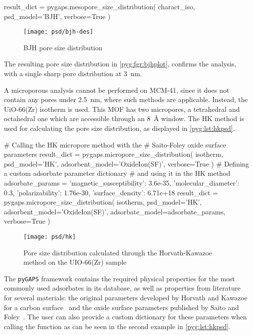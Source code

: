 \begin{python}[caption={PSD using the BJH method},%
    label={pyg:lst:bjh}]
result_dict = pygaps.mesopore_size_distribution(
    charact_iso,
    psd_model='BJH',
    verbose=True
)
\end{python}

\begin{figure}[!htb]
	\centering
	\texttt{[image: psd/bjh-des]}
	\caption{BJH pore size distribution}%
	\label{pyg:fgr:bjhplot}
\end{figure}

The resulting pore size distribution in \autoref{pyg:fgr:bjhplot},
confirms the analysis, with a single sharp pore distribution 
at \SI{3}{\nano\metre}.

A microporous analysis cannot be performed on MCM-41, since 
it does not contain any pores under \SI{2.5}{\nano\metre}, 
where such methods are applicable. Instead, the UiO-66(Zr)
isotherm is used. This MOF has two micropores, a tetrahedral
and octahedral one which are accessible through an \SI{8}{\angstrom}
window. The HK method is used for calculating the pore size 
distribution, as displayed in \autoref{pyg:lst:hkpsd}.

\begin{python}[float=htb, caption={Using the HK method for PSD},%
    label={pyg:lst:hkpsd}]
# Calling the HK micropore method with the 
# Saito-Foley oxide surface parameters
result_dict = pygaps.micropore_size_distribution(
    isotherm,
    psd_model='HK',
    adsorbent_model='OxideIon(SF)',
    verbose=True
)
# Defining a custom adsorbate parameter dictionary 
# and using it in the HK method
adsorbate_params = {
    'magnetic_susceptibility': 3.6e-35,
    'molecular_diameter': 0.3,
    'polarizability': 1.76e-30,
    'surface_density': 6.71e+18
}
result_dict = pygaps.micropore_size_distribution(
    isotherm,
    psd_model='HK',
    adsorbent_model='OxideIon(SF)',
    adsorbate_model=adsorbate_params,
    verbose=True
)
\end{python}

\begin{figure}[!htb]
	\texttt{[image: psd/hk]}
	\caption{Pore size distribution calculated through the Horvath-Kawazoe method on the UIO-66(Zr) sample}%
	\label{fig:pyg:fig:hk}
\end{figure}

The \texttt{pyGAPS} framework contains the required physical properties
for the most commonly used adsorbates in its database, as well as
properties from literature for several materials:
the original parameters developed by Horvath and Kawazoe for a 
carbon surface~\cite{horvathMethodCalculationEffective1983} and the
oxide surface parameters published by Saito and
Foley~\cite{saitoCurvatureParametricSensitivity1991}.
The user can also provide a custom dictionary for these parameters
when calling the function as can be seen in the second example
in \autoref{pyg:lst:hkpsd}.

